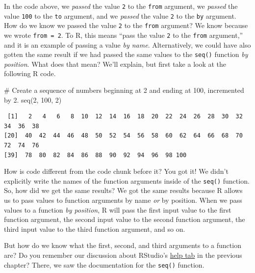 \documentclass[
  letterpaper,
  DIV=11,
  numbers=noendperiod]{scrreprt}
\newenvironment{Shaded}{\begin{snugshade}}{\end{snugshade}}
\newcommand{\CommentTok}[1]{\textcolor[rgb]{0.37,0.37,0.37}{#1}}
\newcommand{\DecValTok}[1]{\textcolor[rgb]{0.68,0.00,0.00}{#1}}
\newcommand{\FunctionTok}[1]{\textcolor[rgb]{0.28,0.35,0.67}{#1}}
\newcommand{\NormalTok}[1]{\textcolor[rgb]{0.00,0.23,0.31}{#1}}
\begin{document}
In the code above, we \emph{passed} the value \texttt{2} to the
\texttt{from} argument, we \emph{passed} the value \texttt{100} to the
\texttt{to} argument, and we \emph{passed} the value \texttt{2} to the
\texttt{by} argument. How do we know we passed the value \texttt{2} to
the \texttt{from} argument? We know because we wrote
\texttt{from\ =\ 2}. To R, this means ``pass the value \texttt{2} to the
\texttt{from} argument,'' and it is an example of passing a value
\emph{by name}. Alternatively, we could have also gotten the same result
if we had passed the same values to the \texttt{seq()} function \emph{by
position}. What does that mean? We'll explain, but first take a look at
the following R code.

\begin{Shaded}
\begin{Highlighting}[]
\CommentTok{\# Create a sequence of numbers beginning at 2 and ending at 100, incremented by 2.}
\FunctionTok{seq}\NormalTok{(}\DecValTok{2}\NormalTok{, }\DecValTok{100}\NormalTok{, }\DecValTok{2}\NormalTok{)}
\end{Highlighting}
\end{Shaded}

\begin{verbatim}
 [1]   2   4   6   8  10  12  14  16  18  20  22  24  26  28  30  32  34  36  38
[20]  40  42  44  46  48  50  52  54  56  58  60  62  64  66  68  70  72  74  76
[39]  78  80  82  84  86  88  90  92  94  96  98 100
\end{verbatim}

How is code different from the code chunk before it? You got it! We
didn't explicitly write the names of the function arguments inside of
the \texttt{seq()} function. So, how did we get the same results? We got
the same results because R allows us to pass values to function
arguments by name \emph{or} by position. When we pass values to a
function \emph{by position}, R will pass the first input value to the
first function argument, the second input value to the second function
argument, the third input value to the third function argument, and so
on.

But how do we know what the first, second, and third arguments to a
function are? Do you remember our discussion about RStudio's
\hyperref[the-files-pane]{help tab} in the previous chapter? There, we
saw the documentation for the \texttt{seq()} function.
\end{document}
